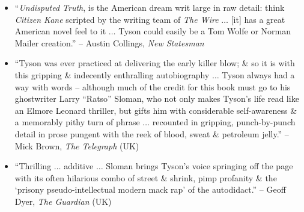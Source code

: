 \documentclass{article}
\numberwithin{equation}{section}
\begin{document}
\begin{itemize}
	\item ``\textit{Undisputed Truth}, is the American dream writ large in raw detail: think \textit{Citizen Kane} scripted by the writing team of \textit{The Wire} $\ldots$ [it] has a great American novel feel to it $\ldots$ Tyson could easily be a Tom Wolfe or Norman Mailer creation.'' -- Austin Collings, \textit{New Statesman}
	\item ``Tyson was ever practiced at delivering the early killer blow; \& so it is with this gripping \& indecently enthralling autobiography $\ldots$ Tyson always had a way with words -- although much of the credit for this book must go to his ghostwriter Larry ``Ratso'' Sloman, who not only makes Tyson's life read like an Elmore Leonard thriller, but gifts him with considerable self-awareness \& a memorably pithy turn of phrase $\ldots$ recounted in gripping, punch-by-punch detail in prose pungent with the reek of blood, sweat \& petroleum jelly.'' -- Mick Brown, \textit{The Telegraph} (UK)
	\item ``Thrilling $\ldots$ additive $\ldots$ Sloman brings Tyson's voice springing off the page with its often hilarious combo of street \& shrink, pimp profanity \& the `prisony pseudo-intellectual modern mack rap' of the autodidact.'' -- Geoff Dyer, \textit{The Guardian} (UK)
\end{itemize}

\end{document}
